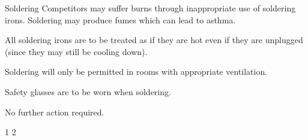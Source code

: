 {    \risk
        {Soldering}
        {Competitors may suffer burns through inappropriate use of soldering
         irons. Soldering may produce fumes which can lead to asthma.}
        {\item All soldering irons are to be treated as if they are hot even if
         they are unplugged (since they may still be cooling down).
         \item Soldering will only be permitted in rooms with appropriate
         ventilation.
         \item Safety glasses are to be worn when soldering.}
        {\item No further action required.}
        {1} %
        {2} %
}


\newcommand{\postrisks}{
    \subsection*{Risk of fire}

    To minimise the risk of fire resulting from this activity, food and drink
    will not be allowed near electrical equipment, and naked flames will be
    prohibited. The risk of fire occurring elsewhere in the building(s) is
    controlled primarily by the building operator\estatesfacilitiesfootnote.
    Staff will ensure that all people present are informed of the locations of
    the exits and whether any fire drills are expected to take place. Should a
    fire break out (or any other event requiring evacuation), all people are to
    evacuate through the nearest accessible exit.
}



